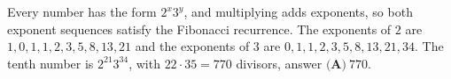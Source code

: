 Every number has the form $2^x3^y$, and multiplying adds exponents, so both exponent sequences satisfy the Fibonacci recurrence. The exponents of $2$ are $1,0,1,1,2,3,5,8,13,21$ and the exponents of $3$ are $0,1,1,2,3,5,8,13,21,34$. The tenth number is $2^{21}3^{34}$, with $22\cdot35=770$ divisors, answer $\boxed{\textbf{(A)}\ 770}$.
